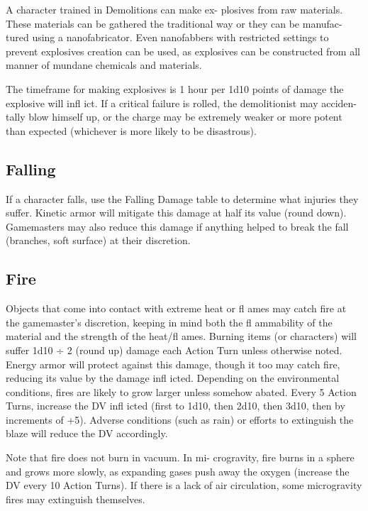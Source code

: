 A character trained in Demolitions can make ex-
plosives from raw materials. These materials can be 
gathered the traditional way or they can be manufac-
tured using a nanofabricator. Even nanofabbers with 
restricted settings to prevent explosives creation can 
be used, as explosives can be constructed from all 
manner of mundane chemicals and materials.

The timeframe for making explosives is 1 hour per 
1d10 points of damage the explosive will infl ict. If a 
critical failure is rolled, the demolitionist may acciden-
tally blow himself up, or the charge may be extremely 
weaker or more potent than expected (whichever is 
more likely to be disastrous).

\subsection{Falling}

If a character falls, use the Falling Damage table to 
determine what injuries they suffer. Kinetic armor 
will mitigate this damage at 
half its value (round down). 
Gamemasters may also reduce 
this damage if anything helped 
to break the fall (branches, soft 
surface) at their discretion.

\subsection{Fire}

Objects that come into contact with extreme heat or 
fl ames may catch fire at the gamemaster's discretion, 
keeping in mind both the fl ammability of the material 
and the strength of the heat/fl ames. Burning items (or 
characters) will suffer 1d10 ÷ 2 (round up) damage 
each Action Turn unless otherwise noted. Energy 
armor will protect against this damage, though it 
too may catch fire, reducing its value by the damage 
infl icted. Depending on the environmental conditions, 
fires are likely to grow larger unless somehow abated. 
Every 5 Action Turns, increase the DV infl icted (first 
to 1d10, then 2d10, then 3d10, then by increments 
of +5). Adverse conditions (such as rain) or efforts to 
extinguish the blaze will reduce the DV accordingly.

Note that fire does not burn in vacuum. In mi-
crogravity, fire burns in a sphere and grows more 
slowly, as expanding gases push away the oxygen 
(increase the DV every 10 Action Turns). If there is a 
lack of air circulation, some microgravity fires may 
extinguish themselves.

